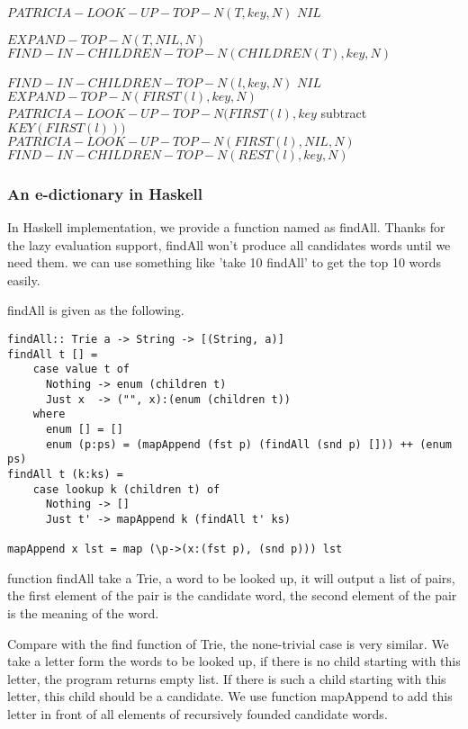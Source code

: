 \documentclass{article}
\begin{document}
\begin{algorithmic}
\STATE $PATRICIA-LOOK-UP-TOP-N(T, key, N)$
    \RETURN $NIL$
  \ENDIF

    \RETURN $EXPAND-TOP-N(T, NIL, N)$
  \ELSE
    \RETURN $FIND-IN-CHILDREN-TOP-N(CHILDREN(T), key, N)$
  \ENDIF

\STATE $FIND-IN-CHILDREN-TOP-N(l, key, N)$
    \RETURN $NIL$
    \RETURN $EXPAND-TOP-N(FIRST(l), key, N)$
    \RETURN $PATRICIA-LOOK-UP-TOP-N(FIRST(l), key$ subtract
    $KEY(FIRST(l)))$
    \RETURN $PATRICIA-LOOK-UP-TOP-N(FIRST(l), NIL, N)$
  \ELSE
    \RETURN $FIND-IN-CHILDREN-TOP-N(REST(l), key, N)$
  \ENDIF
\end{algorithmic}

\subsubsection*{An e-dictionary in Haskell}
In Haskell implementation, we provide a function named as findAll.
Thanks for the lazy evaluation support, findAll won't produce all candidates
words until we need them. we can use something like 'take 10 findAll'
to get the top 10 words easily.

findAll is given as the following.

\lstset{language=Haskell}
\begin{lstlisting}
findAll:: Trie a -> String -> [(String, a)]
findAll t [] = 
    case value t of
      Nothing -> enum (children t) 
      Just x  -> ("", x):(enum (children t))
    where
      enum [] = []
      enum (p:ps) = (mapAppend (fst p) (findAll (snd p) [])) ++ (enum ps)
findAll t (k:ks) = 
    case lookup k (children t) of
      Nothing -> []
      Just t' -> mapAppend k (findAll t' ks)

mapAppend x lst = map (\p->(x:(fst p), (snd p))) lst
\end{lstlisting}

function findAll take a Trie, a word to be looked up, it will output
a list of pairs, the first element of the pair is the candidate word,
the second element of the pair is the meaning of the word.

Compare with the find function of Trie, the none-trivial case is very similar.
We take a letter form the words to be looked up, if there is no child starting
with this letter, the program returns empty list. If there is such a child
starting with this letter, this child should be a candidate. We use function
mapAppend to add this letter in front of all elements of recursively founded
candidate words.
\end{document}
